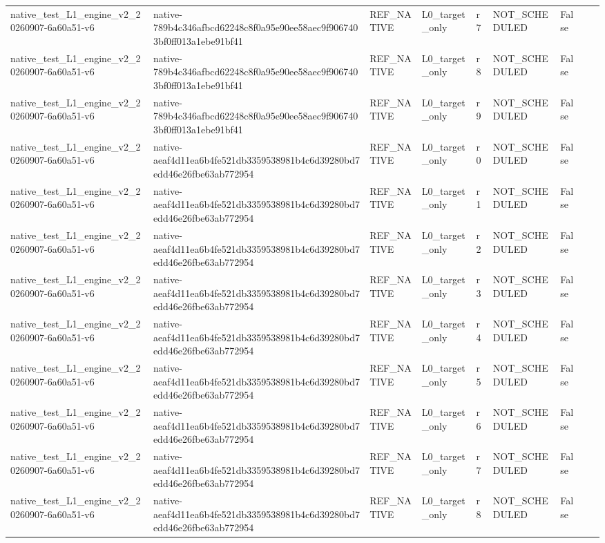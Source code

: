 \begin{tabular}{lllllllll}
native\_test\_L1\_engine\_v2\_20260907-6a60a51-v6 & native-789b4c346afbcd62248c8f0a95e90ee58aec9f9067403bf0ff013a1ebe91bf41 & REF\_NATIVE & L0\_target\_only & r7 & NOT\_SCHEDULED & False &  &  \\
native\_test\_L1\_engine\_v2\_20260907-6a60a51-v6 & native-789b4c346afbcd62248c8f0a95e90ee58aec9f9067403bf0ff013a1ebe91bf41 & REF\_NATIVE & L0\_target\_only & r8 & NOT\_SCHEDULED & False &  &  \\
native\_test\_L1\_engine\_v2\_20260907-6a60a51-v6 & native-789b4c346afbcd62248c8f0a95e90ee58aec9f9067403bf0ff013a1ebe91bf41 & REF\_NATIVE & L0\_target\_only & r9 & NOT\_SCHEDULED & False &  &  \\
native\_test\_L1\_engine\_v2\_20260907-6a60a51-v6 & native-aeaf4d11ea6b4fe521db3359538981b4c6d39280bd7edd46e26fbe63ab772954 & REF\_NATIVE & L0\_target\_only & r0 & NOT\_SCHEDULED & False &  &  \\
native\_test\_L1\_engine\_v2\_20260907-6a60a51-v6 & native-aeaf4d11ea6b4fe521db3359538981b4c6d39280bd7edd46e26fbe63ab772954 & REF\_NATIVE & L0\_target\_only & r1 & NOT\_SCHEDULED & False &  &  \\
native\_test\_L1\_engine\_v2\_20260907-6a60a51-v6 & native-aeaf4d11ea6b4fe521db3359538981b4c6d39280bd7edd46e26fbe63ab772954 & REF\_NATIVE & L0\_target\_only & r2 & NOT\_SCHEDULED & False &  &  \\
native\_test\_L1\_engine\_v2\_20260907-6a60a51-v6 & native-aeaf4d11ea6b4fe521db3359538981b4c6d39280bd7edd46e26fbe63ab772954 & REF\_NATIVE & L0\_target\_only & r3 & NOT\_SCHEDULED & False &  &  \\
native\_test\_L1\_engine\_v2\_20260907-6a60a51-v6 & native-aeaf4d11ea6b4fe521db3359538981b4c6d39280bd7edd46e26fbe63ab772954 & REF\_NATIVE & L0\_target\_only & r4 & NOT\_SCHEDULED & False &  &  \\
native\_test\_L1\_engine\_v2\_20260907-6a60a51-v6 & native-aeaf4d11ea6b4fe521db3359538981b4c6d39280bd7edd46e26fbe63ab772954 & REF\_NATIVE & L0\_target\_only & r5 & NOT\_SCHEDULED & False &  &  \\
native\_test\_L1\_engine\_v2\_20260907-6a60a51-v6 & native-aeaf4d11ea6b4fe521db3359538981b4c6d39280bd7edd46e26fbe63ab772954 & REF\_NATIVE & L0\_target\_only & r6 & NOT\_SCHEDULED & False &  &  \\
native\_test\_L1\_engine\_v2\_20260907-6a60a51-v6 & native-aeaf4d11ea6b4fe521db3359538981b4c6d39280bd7edd46e26fbe63ab772954 & REF\_NATIVE & L0\_target\_only & r7 & NOT\_SCHEDULED & False &  &  \\
native\_test\_L1\_engine\_v2\_20260907-6a60a51-v6 & native-aeaf4d11ea6b4fe521db3359538981b4c6d39280bd7edd46e26fbe63ab772954 & REF\_NATIVE & L0\_target\_only & r8 & NOT\_SCHEDULED & False &  &  \\

\end{tabular}
